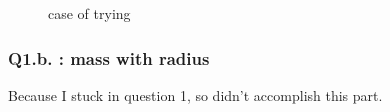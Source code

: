 \documentclass{article}
\begin{document}
\begin{figure}[h]
    \centering
    \caption{case of trying}
    \label{fig:pro1}
\end{figure}

\subsubsection*{Q1.b. : mass with radius}
Because I stuck in question 1, so didn't accomplish this part.
\end{document}

